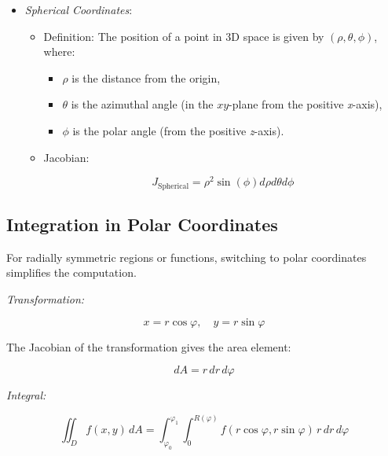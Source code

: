 \begin{itemize}
    \item \emph{Spherical Coordinates}:
    
    \begin{itemize}
        
        \item Definition: The position of a point in 3D space is given by \((\rho, \theta, \phi)\), where:
        
        \begin{itemize}
            
            \item \(\rho\) is the distance from the origin,
            
            \item \(\theta\) is the azimuthal angle (in the \(xy\)-plane from the positive \emph{x}-axis),
            
            \item \(\phi\) is the polar angle (from the positive \emph{z}-axis).
        
        \end{itemize}
        
        \item Jacobian:
               
              \[
                    J_{\text{Spherical}} = \rho^2 \sin (\phi) d\rho d\theta d\phi
              \]
            
    \end{itemize}

\end{itemize}

\subsection{Integration in Polar Coordinates}

For radially symmetric regions or functions, switching to polar coordinates simplifies the computation.
\vspace{\baselineskip}

\emph{Transformation:}

\[
    x = r \cos \varphi, \quad y = r \sin \varphi
\]

The Jacobian of the transformation gives the area element:

\[
    dA = r\, dr\, d\varphi
\]


\emph{Integral:}

\[
    \iint_D f(x, y)\, dA = \int_{\varphi_0}^{\varphi_1} \int_{0}^{R(\varphi)} f(r \cos \varphi, r 
    \sin \varphi)\, r\, dr\, d\varphi
\]

